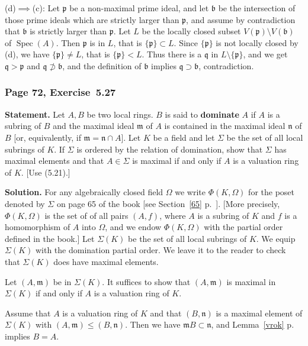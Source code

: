 \documentclass[12pt,letterpaper]{article}%
\newcommand{\mf}{\mathfrak}
\newcommand{\bbb}{\mf b}
\newcommand{\mmm}{\mf m}
\newcommand{\nnn}{\mf n}
\newcommand{\ppp}{\mf p}
\newcommand{\qqq}{\mf q}
\newcommand{\Spec}{\operatorname{Spec}}\newcommand{\Sp}{\operatorname{Spec}}
\newcommand{\nn}{\noindent}
\begin{document}
\nn(d)$\implies$(c): Let $\ppp$ be a non-maximal prime ideal, and let $\bbb$ be the intersection of those prime ideals which are strictly larger than $\ppp$, and assume by contradiction that $\bbb$ is strictly larger than $\ppp$. Let $L$ be the locally closed subset $V(\ppp)\setminus V(\bbb)$ of $\Spec(A)$. Then $\ppp$ is in $L$, that is $\{\ppp\}\subset L$. Since $\{\ppp\}$ is not locally closed by (d), we have $\{\ppp\}\ne L$, that is $\{\ppp\}<L$. Thus there is a $\qqq$ in $L\setminus\{\ppp\}$, and we get $\qqq>\ppp$ and $\qqq\not\supset\bbb$, and the definition of $\bbb$ implies $\qqq\supset\bbb$, contradiction.

\subsubsection{Page 72, Exercise~5.27}\label{527}%

\textbf{Statement.} Let $A,B$ be two local rings. $B$ is said to \textbf{dominate} $A$ if $A$ is a subring of $B$ and the maximal ideal $\mmm$ of $A$ is contained in the maximal ideal $\nnn$ of $B$ [or, equivalently, if $\mmm=\nnn\cap A$]. Let $K$ be a field and let $\Sigma$ be the set of all local subrings of $K$. If $\Sigma$ is ordered by the relation of domination, show that $\Sigma$ has maximal elements and that $A\in\Sigma$ is maximal if and only if $A$ is a valuation ring of $K$. [Use (5.21).]

\nn\textbf{Solution.} For any algebraically closed field $\Omega$ we write $\Phi(K,\Omega)$ for the poset denoted by $\Sigma$ on page 65 of the book [see Section~\ref{65} p.~\pageref{65}]. [More precisely, $\Phi(K,\Omega)$ is the set of of all pairs $(A,f)$, where $A$ is a subring of $K$ and $f$ is a homomorphism of $A$ into $\Omega$, and we endow $\Phi(K,\Omega)$ with the partial order defined in the book.] Let $\Sigma(K)$ be the set of all local subrings of $K$. We equip $\Sigma(K)$ with the domination partial order. We leave it to the reader to check that $\Sigma(K)$ does have maximal elements.

Let $(A,\mmm)$ be in $\Sigma(K)$. It suffices to show that $(A,\mmm)$ is maximal in $\Sigma(K)$ if and only if $A$ is a valuation ring of $K$.

Assume that $A$ is a valuation ring of $K$ and that $(B,\nnn)$ is a maximal element of $\Sigma(K)$ with $(A,\mmm)\le(B,\nnn)$. Then we have $\mmm B\subset\nnn$, and Lemma~\ref{vrok} p.~\pageref{vrok} implies $B=A$. 
\end{document}
